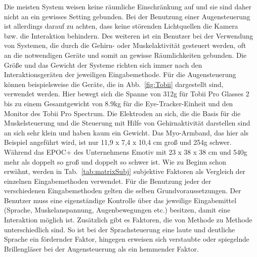 \newline \newline \newline \newline \newline
Die meisten System weisen keine räumliche Einschränkung auf und sie sind daher nicht an ein gewisses Setting gebunden. Bei der Benutzung einer Augensteuerung ist allerdings darauf zu achten, dass keine störenden Lichtquellen die Kamera bzw. die Interaktion behindern. Des weiteren ist ein Benutzer bei der Verwendung von Systemen, die durch die Gehirn- oder Muskelaktivität gesteuert werden, oft an die notwendigen Geräte und somit an gewisse Räumlichkeiten gebunden.
\newline \newline
Die Größe und das Gewicht der Systeme richten sich immer nach den Interaktionsgeräten der jeweiligen Eingabemethode. Für die Augensteuerung können beispielsweise die Geräte, die in Abb.~\ref{fig:Tobii} dargestellt sind, verwendet werden. Hier bewegt sich die Spanne von 312g für Tobii Pro Glasses 2 bis zu einem Gesamtgewicht von 8.9kg für die Eye-Tracker-Einheit und den Monitor des Tobii Pro Spectrum. Die Elektroden an sich, die die Basis für die Muskelsteuerung und die Steuerung mit Hilfe von Gehirnaktivität darstellen sind an sich sehr klein und haben kaum ein Gewicht. Das Myo-Armband, das hier als Beispiel angeführt wird, ist nur 11,9 x 7,4 x 10,4 cm groß und 254g schwer. Während das EPOC+ des Unternehmens Emotiv mit 23 x 38 x 38 cm und 540g mehr als doppelt so groß und doppelt so schwer ist.
\newline \newline
Wie zu Beginn schon erwähnt, werden in Tab.~\ref{tab:matrixSubj} subjektive Faktoren als Vergleich der einzelnen Eingabemethoden verwendet.
\newline \newline
Für die Benutzung jeder der verschiedenen Eingabemethoden gelten die selben Grundvoraussetzungen. Der Benutzer muss eine eigenständige Kontrolle über das jeweilige Eingabemittel (Sprache, Muskelanspannung, Augenbewegungen etc.) besitzen, damit eine Interaktion möglich ist. Zusätzlich gibt es Faktoren, die von Methode zu Methode unterschiedlich sind. So ist bei der Sprachsteuerung eine laute und deutliche Sprache ein fördernder Faktor, hingegen erweisen sich verstaubte oder spiegelnde Brillengläser bei der Augensteuerung als ein hemmender Faktor.
\newline \newline

